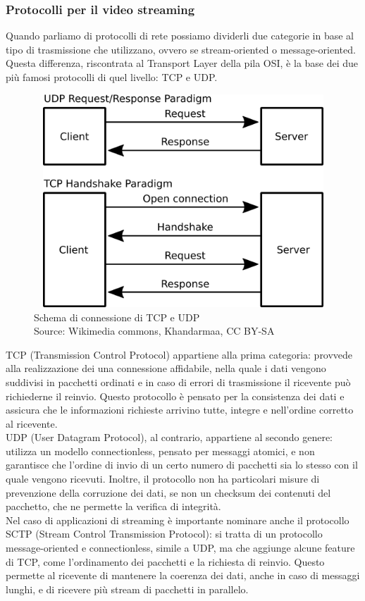 		\subsubsection{Protocolli per il video streaming}
			Quando parliamo di protocolli di rete possiamo dividerli due categorie in base al tipo di trasmissione che utilizzano, ovvero se stream-oriented o message-oriented. Questa differenza, riscontrata al Transport Layer della pila OSI, è la base dei due più famosi protocolli di quel livello: TCP e UDP.\@
			\begin{figure}[H]
				\begin{center}
					\includegraphics[width=16.5cm,height=8cm,keepaspectratio]{immagini/tcp-udp-connections}	
					\caption[Schema di connessione di TCP e UDP]{Schema di connessione di TCP e UDP
					\\
					Source: Wikimedia commons, Khandarmaa, CC BY-SA}
				\end{center}
			\end{figure}
			TCP (Transmission Control Protocol) appartiene alla prima categoria: provvede alla realizzazione dei una connessione affidabile, nella quale i dati vengono suddivisi in pacchetti ordinati e in caso di errori di trasmissione il ricevente può richiederne il reinvio. Questo protocollo è pensato per la consistenza dei dati e assicura che le informazioni richieste arrivino tutte, integre e nell'ordine corretto al ricevente.
			\\
			UDP (User Datagram Protocol), al contrario, appartiene al secondo genere: utilizza un modello connectionless, pensato per messaggi atomici, e non garantisce che l'ordine di invio di un certo numero di pacchetti sia lo stesso con il quale vengono ricevuti. Inoltre, il protocollo non ha particolari misure di prevenzione della corruzione dei dati, se non un checksum dei contenuti del pacchetto, che ne permette la verifica di integrità.
			\\
			Nel caso di applicazioni di streaming è importante nominare anche il protocollo SCTP (Stream Control Transmission Protocol): si tratta di un protocollo message-oriented e connectionless, simile a UDP, ma che aggiunge alcune feature di TCP, come l'ordinamento dei pacchetti e la richiesta di reinvio. Questo permette al ricevente di mantenere la coerenza dei dati, anche in caso di messaggi lunghi, e di ricevere più stream di pacchetti in parallelo.

